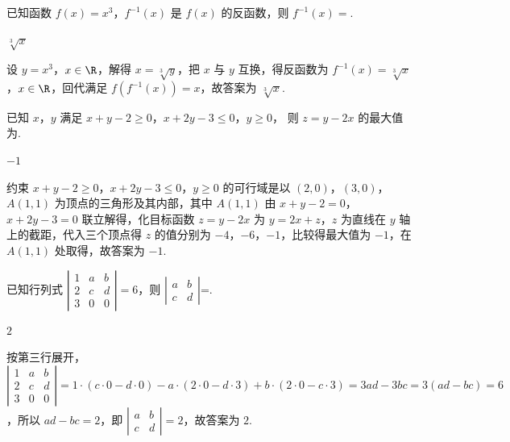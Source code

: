 \begin{problem}
已知函数 \(f(x)=x^3\)，\(f^{-1}(x)\) 是 \(f(x)\) 的反函数，则 \(f^{-1}(x)=\)\fillinblank{}.
\end{problem}

\begin{answer}
\(\sqrt[3]{x}\)
\end{answer}

\begin{solution}
设 \(y=x^3\)，\(x\in\R\)，解得 \(x=\sqrt[3]{y}\)，把 \(x\) 与 \(y\) 互换，得反函数为 \(f^{-1}(x)=\sqrt[3]{x}\)，\(x\in\R\)，回代满足 \(f\left(f^{-1}(x)\right)=x\)，故答案为 \(\sqrt[3]{x}\).
\end{solution}

\begin{problem}
已知 \(x\)，\(y\) 满足 \(x+y-2\ge0\)，\(x+2y-3\le0\)，\(y\ge0\)，
则 \(z=y-2x\) 的最大值为\fillinblank{}.

\end{problem}

\begin{answer}
\(-1\)
\end{answer}

\begin{solution}
约束 \(x+y-2\ge 0\)，\(x+2y-3\le 0\)，\(y\ge 0\) 的可行域是以 \((2,0)\)，\((3,0)\)，\(A(1,1)\) 为顶点的三角形及其内部，其中 \(A(1,1)\) 由 \(x+y-2=0\)，\(x+2y-3=0\) 联立解得，化目标函数 \(z=y-2x\) 为 \(y=2x+z\)，\(z\) 为直线在 \(y\) 轴上的截距，代入三个顶点得 \(z\) 的值分别为 \(-4\)，\(-6\)，\(-1\)，比较得最大值为 \(-1\)，在 \(A(1,1)\) 处取得，故答案为 \(-1\).
\end{solution}

\begin{problem}
已知行列式 \(\left|\begin{matrix}
1 & a & b\\
2 & c & d\\
3 & 0 & 0
\end{matrix}\right|=6\)，则 \(\left|\begin{matrix}
a & b\\
c & d
\end{matrix}\right|\)=\fillinblank{}.
\end{problem}

\begin{answer}
\(2\)
\end{answer}

\begin{solution}
按第三行展开，\(\left|\begin{matrix}1 & a & b\\ 2 & c & d\\ 3 & 0 & 0\end{matrix}\right|=1\cdot\left(c\cdot 0-d\cdot 0\right)-a\cdot\left(2\cdot 0-d\cdot 3\right)+b\cdot\left(2\cdot 0-c\cdot 3\right)=3ad-3bc=3\left(ad-bc\right)=6\)，所以 \(ad-bc=2\)，即 \(\left|\begin{matrix}a & b\\ c & d\end{matrix}\right|=2\)，故答案为 \(2\).
\end{solution}

